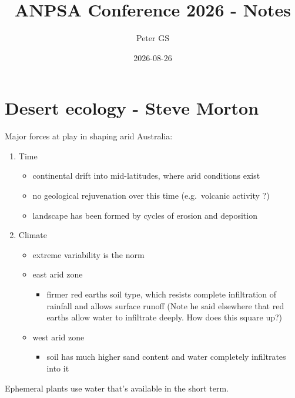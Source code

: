 \documentclass[
]{article}
\title{ANPSA Conference 2026 - Notes}
\author{Peter GS}
\date{2026-08-26}
\providecommand{\tightlist}{%
  \setlength{\itemsep}{0pt}\setlength{\parskip}{0pt}}
\begin{document}
\maketitle

\section{Desert ecology - Steve
Morton}\label{desert-ecology---steve-morton}

Major forces at play in shaping arid Australia:

\begin{enumerate}
\def\labelenumi{\arabic{enumi}.}
\item
  Time

  \begin{itemize}
  \tightlist
  \item
    continental drift into mid-latitudes, where arid conditions exist
  \item
    no geological rejuvenation over this time (e.g.~volcanic activity ?)
  \item
    landscape has been formed by cycles of erosion and deposition
  \end{itemize}
\item
  Climate

  \begin{itemize}
  \tightlist
  \item
    extreme variability is the norm
  \item
    east arid zone

    \begin{itemize}
    \tightlist
    \item
      firmer red earths soil type, which resists complete infiltration
      of rainfall and allows surface runoff (Note he said elsewhere that
      red earths allow water to infiltrate deeply. How does this square
      up?)
    \end{itemize}
  \item
    west arid zone

    \begin{itemize}
    \tightlist
    \item
      soil has much higher sand content and water completely infiltrates
      into it
    \end{itemize}
  \end{itemize}
\end{enumerate}

Ephemeral plants use water that's available in the short term.
\end{document}
